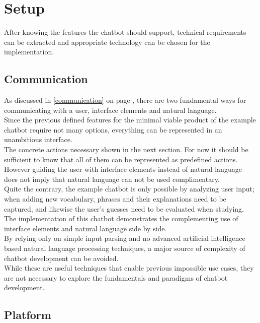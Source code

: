 \section{Setup}


After knowing the features the chatbot should support,
technical requirements can be extracted
and appropriate technology can be chosen for the implementation.


\subsection{Communication}

As discussed in \ref{communication} on page \pageref{communication},
there are two fundamental ways for communicating with a user,
interface elements and natural language.
\\

Since the previous defined features for the minimal viable product of the example chatbot require not many options,
everything can be represented in an unambitious interface.
\\

The concrete actions necessary shown in the next section.
For now it should be sufficient to know that all of them can be represented as predefined actions.
\\
However guiding the user with interface elements instead of natural language
does not imply that natural language can not be used complimentary.
\\
Quite the contrary, the example chatbot is only possible by analyzing user input;
when adding new vocabulary, phrases and their explanations need to be captured,
and likewise the user's guesses need to be evaluated when studying.
\\

The implementation of this chatbot demonstrates the complementing use of interface elements and natural language side by side.
\\

By relying only on simple input parsing and no advanced artificial intelligence based natural language processing techniques,
a major source of complexity of chatbot development can be avoided.
\\
While these are useful techniques that enable previous impossible use cases,
they are not necessary to explore the fundamentals and paradigms of chatbot development.
\\

\subsection{Platform}

